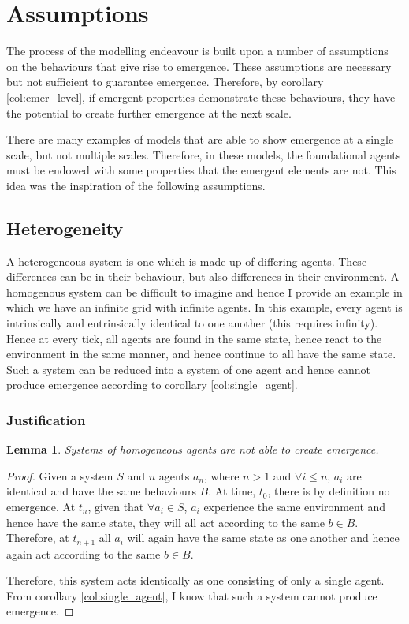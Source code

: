\documentclass{article}
\newtheorem{lemma}[theorem]{Lemma}
\begin{document}
\section{Assumptions}

The process of the modelling endeavour is built upon a number of assumptions on the behaviours that give rise to emergence. These assumptions are necessary but not sufficient to guarantee emergence. Therefore, by corollary \ref{col:emer_level}, if emergent properties demonstrate these behaviours, they have the potential to create further emergence at the next scale.

      There are many examples of models that are able to show emergence at a single scale, but not multiple scales. Therefore, in these models, the foundational agents must be endowed with some properties that the emergent elements are not. This idea was the inspiration of the following assumptions.

      
  \subsection{Heterogeneity}
  \label{sec: hetro}
  
    A heterogeneous system is one which is made up of differing agents. These differences can be in their behaviour, but also differences in their environment. A homogenous system can be difficult to imagine and hence I provide an example in which we have an infinite grid with infinite agents. In this example, every agent is intrinsically and entrinsically identical to one another (this requires infinity). Hence at every tick, all agents are found in the same state, hence react to the environment in the same manner, and hence continue to all have the same state. Such a system can be reduced into a system of one agent and hence cannot produce emergence according to corollary \ref{col:single_agent}.

    \subsubsection{Justification}

      \begin{lemma}
        Systems of homogeneous agents are not able to create emergence. 
      \end{lemma}
      \begin{proof}

        Given a system $S$ and $n$ agents $a_n$, where $n > 1$ and $\forall i \leq n$, $a_i$ are identical and have the same behaviours $B$. At time, $t_0$, there is by definition no emergence. At $t_n$, given that $\forall a_i \in S$, $a_i$ experience the same environment and hence have the same state, they will all act according to the same $b \in B$. Therefore, at $t_{n+1}$ all $a_i$ will again have the same state as one another and hence again act according to the same $b \in B$.

        Therefore, this system acts identically as one consisting of only a single agent. From corollary \ref{col:single_agent}, I know that such a system cannot produce emergence.

      \end{proof}
\end{document}
